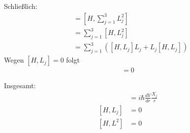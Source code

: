 \documentclass[11pt,a4paper]{scrartcl}
\begin{document}
\begin{enumerate}[label=(\alph*)]
\begin{tcolorbox}[title=Berechnung, breakable]
        Schließlich:
        \begin{align*}
            [H,L^2] &= \left[H,\sum\limits_{j=1}^3 L_j^2\right]\\
            &= \sum\limits_{j=1}^3 [H,L_j^2]\\
            &= \sum\limits_{j=1}^3 \left([H,L_j]L_j + L_j[H,L_j]\right)
        \end{align*}
        Wegen $[H,L_j]=0$ folgt
        \begin{align*}
            [H,L^2] = 0
        \end{align*}

        Insgesamt:
        \begin{align*}
            [H,P_j] &= i\hbar \frac{dV}{dr}\frac{X_j}{r}\\
            [H,L_j] &= 0\\
            [H,L^2] &= 0
        \end{align*}
    \end{tcolorbox}
\end{enumerate}
\end{document}
